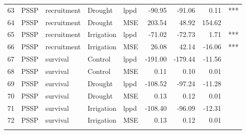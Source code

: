 \begin{longtable}{rllllrrrl}
  63 & PSSP & recruitment & Drought & lppd & -90.95 & -91.06 & 0.11 & *** \\ 
  64 & PSSP & recruitment & Drought & MSE & 203.54 & 48.92 & 154.62 &  \\ 
  65 & PSSP & recruitment & Irrigation & lppd & -71.02 & -72.73 & 1.71 & *** \\ 
  66 & PSSP & recruitment & Irrigation & MSE & 26.08 & 42.14 & -16.06 & *** \\ 
  67 & PSSP & survival & Control & lppd & -191.00 & -179.44 & -11.56 &  \\ 
  68 & PSSP & survival & Control & MSE & 0.11 & 0.10 & 0.01 &  \\ 
  69 & PSSP & survival & Drought & lppd & -108.52 & -97.24 & -11.28 &  \\ 
  70 & PSSP & survival & Drought & MSE & 0.13 & 0.12 & 0.01 &  \\ 
  71 & PSSP & survival & Irrigation & lppd & -108.40 & -96.09 & -12.31 &  \\ 
  72 & PSSP & survival & Irrigation & MSE & 0.13 & 0.12 & 0.01 &  \\ 
  \hline
\label{table:treatmentPreds}
\end{longtable}
